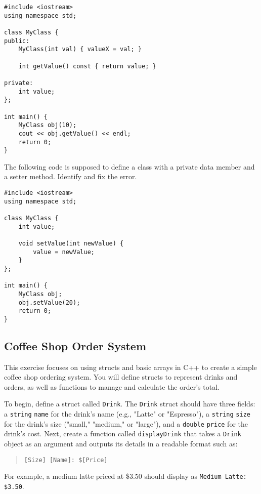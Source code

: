 \begin{verbatim}
#include <iostream>
using namespace std;

class MyClass {
public:
    MyClass(int val) { valueX = val; }

    int getValue() const { return value; }

private:
    int value;
};

int main() {
    MyClass obj(10);
    cout << obj.getValue() << endl;
    return 0;
}
\end{verbatim}

\begin{multipart}
The following code is supposed to define a class with a private data member and a setter method. Identify and fix the error.
\end{multipart}

\begin{verbatim}
#include <iostream>
using namespace std;

class MyClass {
    int value;

    void setValue(int newValue) {
        value = newValue;
    }
};

int main() {
    MyClass obj;
    obj.setValue(20);
    return 0;
}
\end{verbatim}


\subsection{Coffee Shop Order System}
This exercise focuses on using structs and basic arrays in C++ to create a simple coffee shop ordering system. You will define structs to represent drinks and orders, as well as functions to manage and calculate the order's total.

To begin, define a struct called \texttt{Drink}. The \texttt{Drink} struct should have three fields: a \texttt{string} \texttt{name} for the drink’s name (e.g., "Latte" or "Espresso"), a \texttt{string} \texttt{size} for the drink’s size ("small," "medium," or "large"), and a \texttt{double} \texttt{price} for the drink’s cost. Next, create a function called \texttt{displayDrink} that takes a \texttt{Drink} object as an argument and outputs its details in a readable format such as:

\begin{quote}
\texttt{[Size] [Name]: \$[Price]}
\end{quote}

For example, a medium latte priced at \$3.50 should display as \texttt{Medium Latte: \$3.50}.


